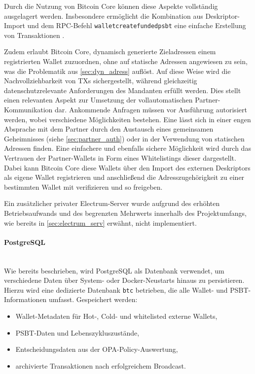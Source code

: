 Durch die Nutzung von Bitcoin Core können diese Aspekte vollständig ausgelagert werden.
Insbesondere ermöglicht die Kombination aus Deskriptor-Import und dem \ac{RPC}-Befehl \texttt{{walletcreatefundedpsbt}} eine einfache Erstellung von Transaktionen \cite{bitcoincore_walletcreatefundedpsbt}.

Zudem erlaubt Bitcoin Core, dynamisch generierte Zieladressen einem registrierten Wallet zuzuordnen, ohne auf statische Adressen angewiesen zu sein, was die Problematik aus \ref{sec:dyn_adress} auflöst. Auf diese Weise wird die Nachvollziehbarkeit von \acp{TX} sichergestellt, während gleichzeitig datenschutzrelevante Anforderungen des Mandanten erfüllt werden.
Dies stellt einen relevanten Aspekt zur Umsetzung der vollautomatischen Partner-Kommunikation dar. Ankommende Anfragen müssen vor Ausführung autorisiert werden, wobei verschiedene Möglichkeiten bestehen. Eine lässt sich in einer engen Absprache mit dem Partner durch den Austausch eines gemeinsamen Geheimnisses (siehe \ref{sec:partner_auth}) oder in der Verwendung von statischen Adressen finden.
Eine einfachere und ebenfalls sichere Möglichkeit wird durch das Vertrauen der Partner-Wallets in Form eines Whitelistings dieser dargestellt. Dabei kann Bitcoin Core diese Wallets über den Import des externen Deskriptors als eigene Wallet registrieren und anschließend die Adresszugehörigkeit zu einer bestimmten Wallet mit  verifizieren und so freigeben.

Ein zusätzlicher privater Electrum-Server wurde aufgrund des erhöhten Betriebsaufwands und des begrenzten Mehrwerts innerhalb des Projektumfangs, wie bereits in \ref{sec:electrum_serv} erwähnt, nicht implementiert.

\paragraph{PostgreSQL} \label{sec:btc_db} \mbox{}\\
Wie bereits beschrieben, wird PostgreSQL als Datenbank verwendet, um verschiedene Daten über System- oder Docker-Neustarts hinaus zu persistieren.
Hierzu wird eine dedizierte Datenbank \texttt{btc} betrieben, die alle Wallet- und \ac{PSBT}-Informationen umfasst.
Gespeichert werden:
\begin{itemize}
    \item Wallet-Metadaten für Hot-, Cold- und whitelisted externe Wallets,
    \item \ac{PSBT}-Daten und Lebenszykluszustände,
    \item Entscheidungsdaten aus der \ac{OPA}-Policy-Auswertung,
    \item archivierte Transaktionen nach erfolgreichem Broadcast.
\end{itemize}


